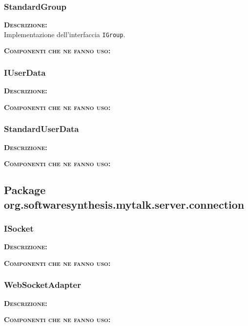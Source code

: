 \subsubsection{StandardGroup}
\begin{description}
	\item{\scshape\bfseries Descrizione:}\\
Implementazione dell'interfaccia \texttt{IGroup}.
	\item{\scshape\bfseries Componenti che ne fanno uso:} 
\end{description}

\subsubsection{IUserData}
\begin{description}
	\item{\scshape\bfseries Descrizione:} 
	\item{\scshape\bfseries Componenti che ne fanno uso:} 
\end{description}

\subsubsection{StandardUserData}
\begin{description}
	\item{\scshape\bfseries Descrizione:} 
	\item{\scshape\bfseries Componenti che ne fanno uso:} 
\end{description}

\subsection{Package org.softwaresynthesis.mytalk.server.connection}
\subsubsection{ISocket}
\begin{description}
	\item{\scshape\bfseries Descrizione:} 
	\item{\scshape\bfseries Componenti che ne fanno uso:} 
\end{description}

\subsubsection{WebSocketAdapter}
\begin{description}
	\item{\scshape\bfseries Descrizione:} 
	\item{\scshape\bfseries Componenti che ne fanno uso:} 
\end{description}

